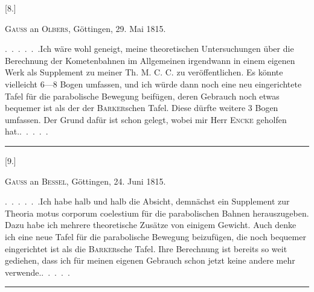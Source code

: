 \clearpage
{}
\begin{center}
[8.]\par
\medskip
\textsc{Gauss} an \textsc{Olbers}, Göttingen, 29. Mai 1815.
\end{center}
\noindent\hspace*{\parindent}.\ .\ .\ .\ .\ .\quad Ich wäre wohl geneigt, meine theoretischen Untersuchungen über die Berechnung der Kometenbahnen im Allgemeinen irgendwann in einem eigenen Werk als Supplement zu meiner Th. M. C. C. zu veröffentlichen. Es könnte vielleicht 6—8 Bogen umfassen, und ich würde dann noch eine neu eingerichtete Tafel für die parabolische Bewegung beifügen, deren Gebrauch noch etwas bequemer ist als der der \textsc{Barker}schen Tafel. Diese dürfte weitere 3 Bogen umfassen. Der Grund dafür ist schon gelegt, wobei mir Herr \textsc{Encke} geholfen hat.\quad .\ .\ .\ .\ .
\par\medskip
\begin{center}\rule{.18\textwidth}{.4pt}\end{center}
\medskip
{}
\begin{center}
[9.]\par
\medskip
\textsc{Gauss} an \textsc{Bessel}, Göttingen, 24. Juni 1815.
\end{center}
\noindent\hspace*{\parindent}.\ .\ .\ .\ .\ .\quad Ich habe halb und halb die Absicht, demnächst ein Supplement zur Theoria motus corporum coelestium für die parabolischen Bahnen herauszugeben. Dazu habe ich mehrere theoretische Zusätze von einigem Gewicht. Auch denke ich eine neue Tafel für die parabolische Bewegung beizufügen, die noch bequemer eingerichtet ist als die \textsc{Barker}sche Tafel. Ihre Berechnung ist bereits so weit gediehen, dass ich für meinen eigenen Gebrauch schon jetzt keine andere mehr verwende.\quad .\ .\ .\ .\ .
\par\medskip
\begin{center}\rule{.22\textwidth}{.4pt}\end{center}
